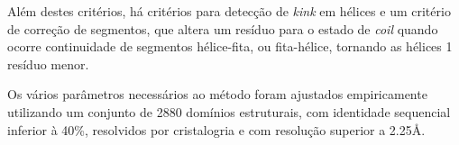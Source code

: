Além destes critérios, há critérios para detecção de \textit{kink} em hélices e um critério de correção de segmentos, que altera um resíduo para o estado de \textit{coil} quando ocorre continuidade de segmentos hélice-fita, ou fita-hélice, tornando as hélices 1 resíduo menor.

Os vários parâmetros necessários ao método foram ajustados empiricamente utilizando um conjunto de 2880 domínios estruturais, com identidade sequencial inferior à 40\%, resolvidos por cristalogria e com resolução superior a 2.25\AA. 





